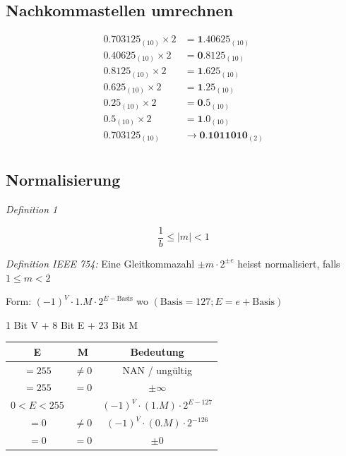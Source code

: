 \documentclass[a4paper,6pt]{article}
\begin{document}
\begin{multicols*}{3}
\subsection*{Nachkommastellen umrechnen}

\begin{align*}
    0.703125_{(10)} \times 2 &= \textbf{1}.40625_{(10)} \\
    0.40625_{(10)} \times 2 &= \textbf{0}.8125_{(10)} \\
    0.8125_{(10)} \times 2 &= \textbf{1}.625_{(10)} \\
    0.625_{(10)} \times 2 &= \textbf{1}.25_{(10)} \\
    0.25_{(10)} \times 2 &= \textbf{0}.5_{(10)} \\
    0.5_{(10)} \times 2 &= \textbf{1}.0_{(10)} \\
    0.703125_{(10)} &\rightarrow \textbf{0.1011010}_{(2)} \\
\end{align*}


\subsection*{Normalisierung}

\textit{Definition 1}

\begin{equation*}
    \frac{1}{b} \leq |m| < 1
\end{equation*}

\textit{Definition IEEE 754: }Eine Gleitkommazahl $\pm m \cdot 2^{\pm e}$ heisst normalisiert, falls $1 \leq m < 2$

Form: $(-1)^V \cdot 1.M \cdot 2^{E-\text{Basis}}$ wo $(\text{Basis} = 127; E = e + \text{Basis})$ 

1 Bit V + 8 Bit E + 23 Bit M
\begin{center}
    \begin{tabular}{|c|c|c|}
    \hline
    E & M & Bedeutung \\ \hline
    \(=255\) & \(\neq0\) & NAN / ungültig \\ \hline
    \(=255\) & \(=0\) & \(\pm\infty\) \\ \hline
    \(0 < E < 255\) & & \((-1)^V \cdot (1.M) \cdot 2^{E-127}\) \\ \hline
    \(=0\) & \(\neq0\) & \((-1)^V \cdot (0.M) \cdot 2^{-126}\) \\ \hline
    \(=0\) & \(=0\) & \(\pm0\) \\ \hline
    \end{tabular}
\end{center}


\end{multicols*}
\end{document}
